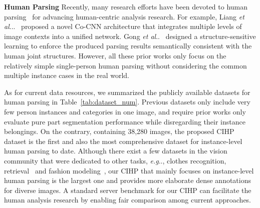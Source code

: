 \documentclass[runningheads]{llncs}
\makeatletter
\DeclareRobustCommand\onedot{\futurelet\@let@token\@onedot}
\def\@onedot{\ifx\@let@token.\else.\null\fi\xspace}
\def\eg{\emph{e.g}\onedot} \def\Eg{\emph{E.g}\onedot}
\def\etal{\emph{et al}\onedot}
\makeatother
\begin{document}
\textbf{Human Parsing}
Recently, many research efforts have been devoted to human parsing~\cite{Co-CNN,yamaguchi2012parsing,Yamaguchiparsing13,SimoSerraACCV2014,M-CNN,xia2015zoom,chen2015attention,Gong_2017_CVPR} for advancing human-centric analysis research. For example, Liang \etal.~\cite{Co-CNN} proposed a novel Co-CNN architecture that integrates multiple levels of image contexts into a unified network. Gong \etal~\cite{Gong_2017_CVPR} designed a structure-sensitive learning to enforce the produced parsing results semantically consistent with the human joint structures. However, all these prior works only focus on the relatively simple single-person human parsing without considering the common multiple instance cases in the real world. 

As for current data resources, we summarized the publicly available datasets for human parsing in Table~\ref{tab:dataset_num}. Previous datasets only include very few person instances and categories in one image, and require prior works only evaluate pure part segmentation performance while disregarding their instance belongings. On the contrary, containing 38,280 images, the proposed CIHP dataset is the first and also the most comprehensive dataset for instance-level human parsing to date. Although there exist a few datasets in the vision community that were dedicated to other tasks, \eg, clothes recognition, retrieval~\cite{liuLQWTcvpr16DeepFashion,WhereToBuyItICCV15} and fashion modeling~\cite{simo2015neuroaesthetics}, our CIHP that mainly focuses on instance-level human parsing is the largest one and provides more elaborate dense annotations for diverse images. A standard server benchmark for our CIHP can facilitate the human analysis research by enabling fair comparison among current approaches.
\end{document}
